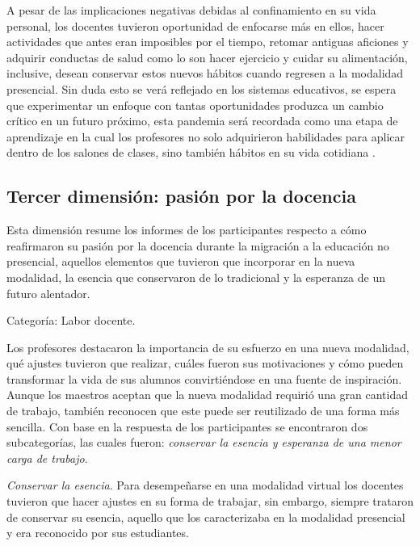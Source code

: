 \documentclass[spanish]{textolivre}
\begin{document}
A pesar de las implicaciones negativas debidas al confinamiento en su vida personal, los docentes tuvieron oportunidad de enfocarse más en ellos, hacer actividades que antes eran imposibles por el tiempo, retomar antiguas aficiones y adquirir conductas de salud como lo son hacer ejercicio y cuidar su alimentación, inclusive, desean conservar estos nuevos hábitos cuando regresen a la modalidad presencial. Sin duda esto se verá reflejado en los sistemas educativos, se espera que experimentar un enfoque con tantas oportunidades produzca un cambio crítico en un futuro próximo, esta pandemia será recordada como una etapa de aprendizaje en la cual los profesores no solo adquirieron habilidades para aplicar dentro de los salones de clases, sino también hábitos en su vida cotidiana \cite{burgos_6-key_2021}.

\subsection{Tercer dimensión: pasión por la docencia}

Esta dimensión resume los informes de los participantes respecto a cómo reafirmaron su pasión por la docencia durante la migración a la educación no presencial, aquellos elementos que tuvieron que incorporar en la nueva modalidad, la esencia que conservaron de lo tradicional y la esperanza de un futuro alentador. 

Categoría: Labor docente.

Los profesores destacaron la importancia de su esfuerzo en una nueva modalidad, qué ajustes tuvieron que realizar, cuáles fueron sus motivaciones y cómo pueden transformar la vida de sus alumnos convirtiéndose en una fuente de inspiración. Aunque los maestros aceptan que la nueva modalidad requirió una gran cantidad de trabajo, también reconocen que este puede ser reutilizado de una forma más sencilla. Con base en la respuesta de los participantes se encontraron dos subcategorías, las cuales fueron: \textit{conservar la esencia y esperanza de una menor carga de trabajo}.

\textit{Conservar la esencia}. Para desempeñarse en una modalidad virtual los docentes tuvieron que hacer ajustes en su forma de trabajar, sin embargo, siempre trataron de conservar su esencia, aquello que los caracterizaba en la modalidad presencial y era reconocido por sus estudiantes. 
\end{document}
